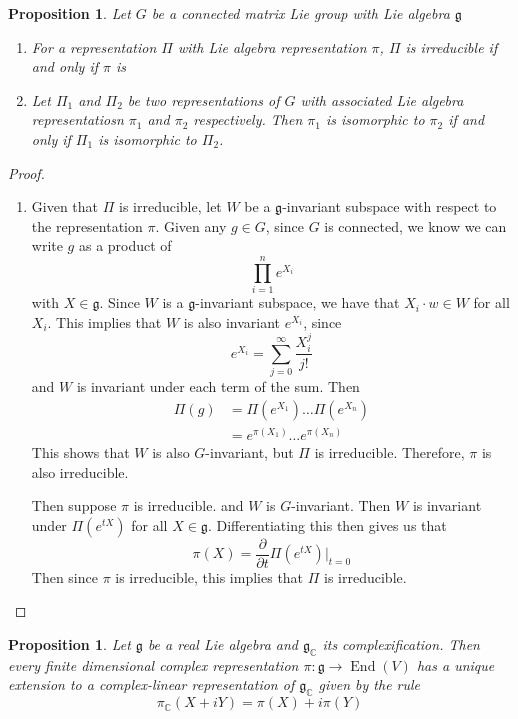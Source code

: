 \documentclass[psamsfonts]{amsart}
\newtheorem{prop}[thm]{Proposition}
\theoremstyle{definition}
\theoremstyle{remark}
\newcommand{\C}{\mathbb{C}}
\newcommand{\g}{\mathfrak{g}}
\newcommand{\bd}{\partial}
\DeclareMathOperator{\End}{End}
\begin{document}
\begin{prop}
Let $G$ be a connected matrix Lie group with Lie algebra $\g$
\begin{enumerate}
\item For a representation $\Pi$ with Lie algebra representation $\pi$, $\Pi$ is irreducible if and only if $\pi$ is
\item Let $\Pi_1$ and $\Pi_2$ be two representations of $G$ with associated Lie algebra representatiosn $\pi_1$ and $\pi_2$ respectively. Then $\pi_1$ is isomorphic to $\pi_2$ if and only if $\Pi_1$ is isomorphic to $\Pi_2$.
\end{enumerate}
\end{prop}

\begin{proof}\ \\ \vspace{-\baselineskip}
\begin{enumerate}
\item Given that $\Pi$ is irreducible, let $W$ be a $\g$-invariant subspace with respect to the representation $\pi$. Given any $g \in G$, since $G$ is connected, we know we can write $g$ as a product of 
$$\prod_{i = 1}^n e^{X_i}$$
 with $X \in \g$. Since $W$ is a $\g$-invariant subspace, we have that $X_i \cdot w \in W$ for all $X_i$. This implies that $W$ is also invariant $e^{X_i}$, since 
 $$e^{X_i} = \sum_{j = 0}^\infty \frac{X_i^j}{j!} $$
 and $W$ is invariant under each term of the sum. Then
 \begin{align*}
 \Pi(g) &= \Pi(e^{X_1}) \ldots \Pi(e^{X_n}) \\
 &= e^{\pi(X_1)} \ldots e^{\pi(X_n)}
 \end{align*}
 This shows that $W$ is also $G$-invariant, but $\Pi$ is irreducible.  Therefore, $\pi$ is also irreducible.
 
 Then suppose $\pi$ is irreducible. and $W$ is $G$-invariant. Then $W$ is invariant under $\Pi(e^{tX})$ for all $X \in \g$. Differentiating this then gives us that 
 $$ \pi(X) = \frac{\bd}{\bd t}\Pi(e^{tX})\big\vert_{t=0}$$
 Then since $\pi$ is irreducible, this implies that $\Pi$ is irreducible.
\end{enumerate}
\end{proof}

\begin{prop}
Let $\g$ be a real Lie algebra and $\g_\C$ its complexification. Then every finite dimensional complex representation $\pi: \g \to \End(V)$ has a unique extension to a complex-linear representation of $\g_\C$ given by the rule
$$ \pi_\C(X + iY) = \pi(X) + i\pi(Y)$$
\end{prop}
\end{document}
